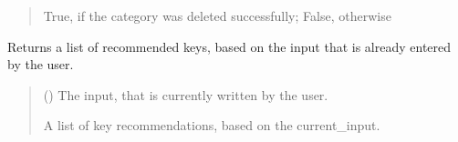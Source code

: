 \documentclass[letterpaper,10pt,english]{sphinxmanual}
\begin{document}
\begin{fulllineitems}
\begin{fulllineitems}
\begin{quote}
\begin{description}
\sphinxAtStartPar
True, if the category was deleted successfully; False, otherwise

\sphinxAtStartPar
{}

\end{description}\end{quote}

\end{fulllineitems}


\begin{fulllineitems}
\label{\detokenize{apidoc/src.osm_configurator.control:src.osm_configurator.control.category_controller.CategoryController.get_list_of_key_recommendations}}
\pysigstartsignatures
{}
\pysigstopsignatures
\sphinxAtStartPar
Returns a list of recommended keys, based on the input that is already entered by the user.
\begin{quote}\begin{description}
\sphinxAtStartPar
{} () \textendash{} The input, that is currently written by the user.

\sphinxAtStartPar
A list of key recommendations, based on the current\_input.

\sphinxAtStartPar
\sphinxhref{https://docs.python.org/3.11/library/stdtypes.html\#list}{list}{[}\sphinxhref{https://docs.python.org/3.11/library/stdtypes.html\#str}{str}{]}

\end{description}\end{quote}

\end{fulllineitems}



\end{fulllineitems}
\end{document}
